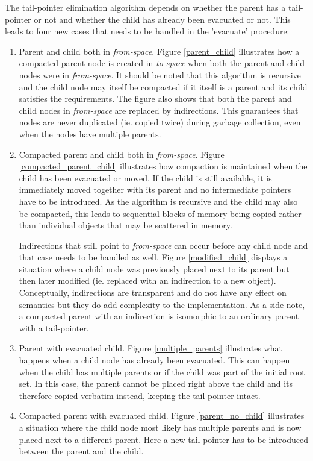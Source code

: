 \documentclass[a4paper,oneside]{memoir}
\begin{document}
The tail-pointer elimination algorithm depends on whether the parent has a
tail-pointer or not and whether the child has already been evacuated or not. This
leads to four new cases that needs to be handled in the 'evacuate' procedure:
\begin{enumerate}
  \item Parent and child both in \emph{from-space}. Figure \ref{parent_child}
    illustrates
    how a compacted parent node is created in \emph{to-space} when both the parent
    and child nodes were in \emph{from-space}. It should be noted that this
    algorithm is recursive and the child node may itself be compacted if it
    itself is a parent and its child satisfies the requirements. The figure also
    shows that both the parent and child nodes in \emph{from-space} are replaced
    by indirections. This guarantees that nodes are never duplicated (ie. copied
    twice) during garbage collection, even when the nodes have multiple parents.

  \item Compacted parent and child both in \emph{from-space}. Figure
    \ref{compacted_parent_child} illustrates how compaction is maintained when
    the child has been evacuated or moved. If the child is still available, it
    is immediately moved together with its parent and no intermediate pointers
    have to be introduced. As the algorithm is recursive and the child may also
    be compacted, this leads to sequential blocks of memory being copied rather
    than individual objects that may be scattered in memory.

    Indirections that still point to \emph{from-space} can occur before any
    child node and that case needs to be handled as well. Figure
    \ref{modified_child} displays a situation where a child node was previously
    placed next to its parent but then later modified (ie. replaced with an
    indirection to a new object). Conceptually, indirections are transparent
    and do not have any effect on semantics but they do add complexity to the
    implementation. As a side note, a compacted parent with an indirection is
    isomorphic to an ordinary parent with a tail-pointer.
  \item Parent with evacuated child. Figure \ref{multiple_parents} illustrates
    what happens when a child node has already been evacuated. This can happen
    when the child has multiple parents or if the child was part of the initial
    root set. In this case, the parent cannot be placed right above the child
    and its therefore copied verbatim instead, keeping the tail-pointer intact.
  \item Compacted parent with evacuated child. Figure \ref{parent_no_child}
    illustrates a situation where the child node most likely has multiple parents
    and is now placed next to a different parent. Here a new tail-pointer has to
    be introduced between the parent and the child.
\end{enumerate}
\end{document}
